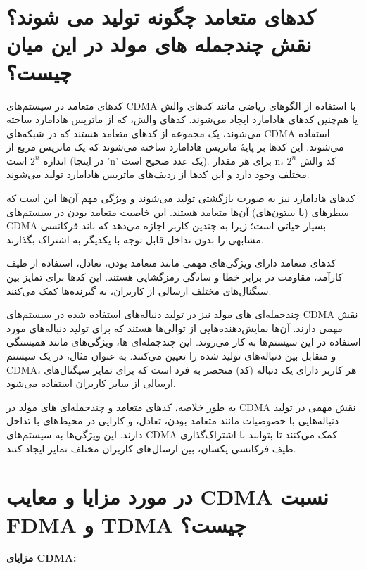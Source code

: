 \section{کدهای متعامد چگونه تولید می شوند؟ نقش چندجمله های مولد در این میان چیست؟}

کدهای متعامد در سیستم‌های CDMA با استفاده از الگوهای ریاضی مانند کدهای والش یا هم‌چنین کدهای هادامارد ایجاد می‌شوند. کدهای والش، که از ماتریس هادامارد ساخته می‌شوند، یک مجموعه از کدهای متعامد هستند که در شبکه‌های CDMA استفاده می‌شوند. این کدها بر پایهٔ ماتریس هادامارد ساخته می‌شوند که یک ماتریس مربع از اندازه $2^n$ است (در اینجا 'n' یک عدد صحیح است). برای هر مقدار n، $2^n$ کد والش مختلف وجود دارد و این کدها از ردیف‌های ماتریس هادامارد تولید می‌شوند.

کدهای هادامارد نیز به صورت بازگشتی تولید می‌شوند و ویژگی مهم آن‌ها این است که سطرهای (یا ستون‌های) آن‌ها متعامد هستند. این خاصیت متعامد بودن در سیستم‌های CDMA بسیار حیاتی است؛ زیرا به چندین کاربر اجازه می‌دهد که باند فرکانسی مشابهی را بدون تداخل قابل توجه با یکدیگر به اشتراک بگذارند.

کدهای متعامد دارای ویژگی‌های مهمی مانند متعامد بودن، تعادل، استفاده از طیف کارآمد، مقاومت در برابر خطا و سادگی رمزگشایی هستند. این کدها برای تمایز بین سیگنال‌های مختلف ارسالی از کاربران، به گیرنده‌ها کمک می‌کنند.

چندجمله‌ای های مولد نیز در تولید دنباله‌های استفاده شده در سیستم‌های CDMA نقش مهمی دارند. آن‌ها نمایش‌دهنده‌هایی از توالی‌ها هستند که برای تولید دنباله‌های مورد استفاده در این سیستم‌ها به کار می‌روند. این چندجمله‌ای ها، ویژگی‌های مانند همبستگی و متقابل بین دنباله‌های تولید شده را تعیین می‌کنند. به عنوان مثال، در یک سیستم CDMA، هر کاربر دارای یک دنباله (کد) منحصر به فرد است که برای تمایز سیگنال‌های ارسالی از سایر کاربران استفاده می‌شود.

به طور خلاصه، کدهای متعامد و چندجمله‌ای های مولد در CDMA نقش مهمی در تولید دنباله‌هایی با خصوصیات مانند متعامد بودن، تعادل، و کارایی در محیط‌های با تداخل دارند. این ویژگی‌ها به سیستم‌های CDMA کمک می‌کنند تا بتوانند با اشتراک‌گذاری طیف فرکانسی یکسان، بین ارسال‌های کاربران مختلف تمایز ایجاد کنند.


\section{در مورد مزایا و معایب CDMA نسبت FDMA و TDMA چیست؟}

\textbf{مزایای CDMA:}

